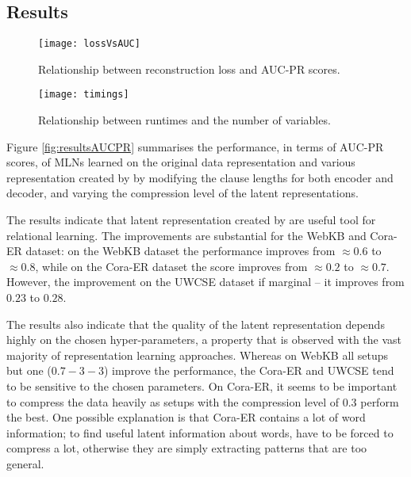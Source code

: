 \subsection{Results}


\begin{figure*}[t!]
	\centering
	\begin{subfigure}[t]{0.45\linewidth}
		\centering
		\texttt{[image: lossVsAUC]}
		\caption{Relationship between reconstruction loss and AUC-PR scores. \label{fig:lossvsaucpr}}
	\end{subfigure}
	\hspace{.5em}
	\begin{subfigure}[t]{0.45\linewidth}
		\centering
		\texttt{[image: timings]}
		
		\caption{Relationship between runtimes and the number of variables.\label{fig:timings}}
	\end{subfigure}
\end{figure*}


Figure \ref{fig:resultsAUCPR} summarises the performance, in terms of AUC-PR scores, of MLNs learned on the original data representation and various representation created by  by modifying the clause lengths for both encoder and decoder, and varying the compression level of the latent representations.




The results indicate that latent representation created by  are useful tool for relational learning.
The improvements are substantial for the WebKB and Cora-ER dataset: on the WebKB dataset the performance improves from $\approx 0.6$ to $\approx 0.8$, while on the Cora-ER dataset the score improves from $\approx 0.2$ to $\approx 0.7$.
However, the improvement on the UWCSE dataset if marginal -- it improves from $0.23$ to $0.28$.



The results also indicate that the quality of the latent representation depends highly on the chosen hyper-parameters, a property that is observed with the vast majority of representation learning approaches.
Whereas on WebKB all setups but one ($0.7-3-3$) improve the performance, the Cora-ER and UWCSE tend to be sensitive to the chosen parameters.
On Cora-ER, it seems to be important to compress the data heavily as setups with the compression level of $0.3$ perform the best.
One possible explanation is that Cora-ER contains a lot of word information; to find useful latent information about words,  have to be forced to compress a lot, otherwise they are simply extracting patterns that are too general.

